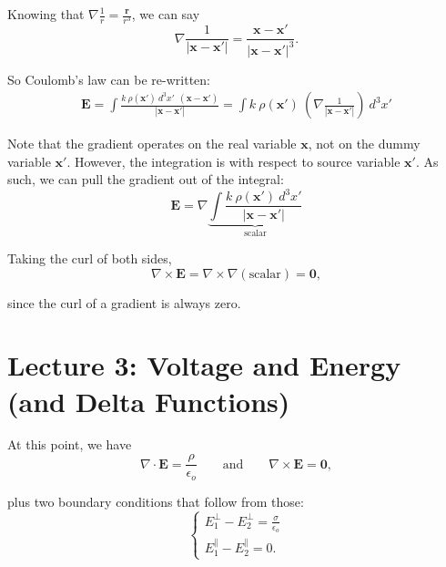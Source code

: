 \documentclass{article}
\numberwithin{equation}{section}
\begin{document}
Knowing that $\displaystyle \nabla \frac{1}{r} = \frac{\bm{r}}{r^3}$, we can say
\begin{equation*}
    \nabla \frac{1}{\left| \bm{x} - \bm{x'} \right|} = \frac{\bm{x} - \bm{x'}}{\left| \bm{x} - \bm{x'} \right|^3}.
\end{equation*}

So Coulomb's law can be re-written:
\begin{align*}
    \bm{E} = \int \frac{k\ \rho(\bm{x'})\ d^3x'\ \ \left( \bm{x} - \bm{x'} \right)}{\left| \bm{x} - \bm{x'} \right|} = \int k\ \rho(\bm{x'})\ \left( \nabla \frac{1}{\left| \bm{x} - \bm{x'} \right|} \right)\ d^3x'
\end{align*}

Note that the gradient operates on the real variable $\bm{x}$, not on the dummy variable $\bm{x'}$. However, the integration is with respect to source variable $\bm{x'}$. As such, we can pull the gradient out of the integral:
\begin{equation*}
    \bm{E} = \nabla \underbrace{\int \frac{k\ \rho(\bm{x'})\ d^3x'}{\left| \bm{x} - \bm{x'} \right|}}_{\displaystyle \text{scalar}}
\end{equation*}

Taking the curl of both sides,
\begin{equation*}
    \nabla \times \bm{E} = \nabla \times \nabla (\text{scalar}) = \bm{0},
\end{equation*}

since the curl of a gradient is always zero.

\newpage

\section*{Lecture 3: Voltage and Energy (and Delta Functions)}
\setcounter{page}{1}

At this point, we have
\begin{equation*}
    \nabla \cdot \bm{E} = \frac{\rho}{\epsilon_o} \qquad \text{and} \qquad \nabla \times \bm{E} = \bm{0},
\end{equation*}

plus two boundary conditions that follow from those:
\begin{equation*}
    \begin{cases} \displaystyle E_{1}^{\perp} - E_{2}^{\perp} = \frac{\sigma}{\epsilon_o} \\ \displaystyle E_{1}^{\parallel} - E_{2}^{\parallel} = 0. \end{cases}
\end{equation*}
\end{document}
